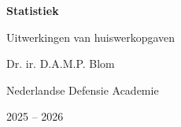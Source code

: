 \begin{titlingpage}
\thispagestyle{empty}

\begin{center}

\vspace*{\fill}
{\Huge\bfseries Statistiek\par}
\vspace{1em}
{\large Uitwerkingen van huiswerkopgaven\par}
\vspace{6cm}

{\Large Dr. ir. D.A.M.P. Blom\par}
\vspace{1em}
{\large Nederlandse Defensie Academie\par}
\vspace{2em}

{\large 2025 -- 2026\par}
\vspace*{\fill}

\end{center}

\end{titlingpage}
